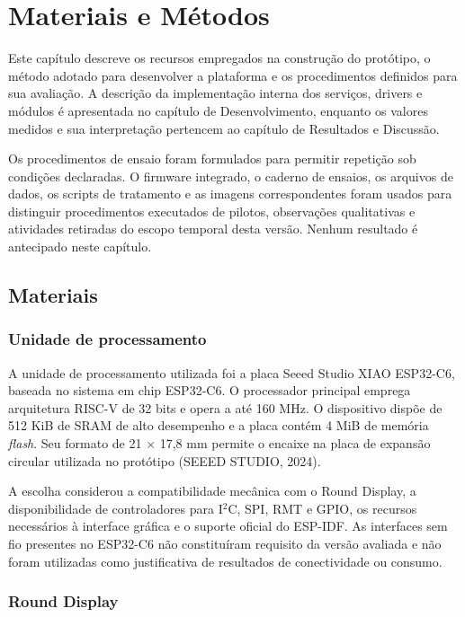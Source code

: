 \documentclass[a4paper,12pt]{article}
\begin{document}
\section{Materiais e M\'etodos}


Este cap\'itulo descreve os recursos empregados na constru\c{c}\~ao do prot\'otipo, o m\'etodo adotado para desenvolver a plataforma e os procedimentos definidos para sua avalia\c{c}\~ao. A descri\c{c}\~ao da implementa\c{c}\~ao interna dos servi\c{c}os, drivers e m\'odulos \'e apresentada no cap\'itulo de Desenvolvimento, enquanto os valores medidos e sua interpreta\c{c}\~ao pertencem ao cap\'itulo de Resultados e Discuss\~ao.


Os procedimentos de ensaio foram formulados para permitir repeti\c{c}\~ao sob condi\c{c}\~oes declaradas. O firmware integrado, o caderno de ensaios, os arquivos de dados, os scripts de tratamento e as imagens correspondentes foram usados para distinguir procedimentos executados de pilotos, observa\c{c}\~oes qualitativas e atividades retiradas do escopo temporal desta vers\~ao. Nenhum resultado \'e antecipado neste cap\'itulo.


\subsection{Materiais}


\subsubsection{Unidade de processamento}


A unidade de processamento utilizada foi a placa Seeed Studio XIAO ESP32-C6, baseada no sistema em chip ESP32-C6. O processador principal emprega arquitetura RISC-V de 32 bits e opera a at\'e 160 MHz. O dispositivo disp\~oe de 512 KiB de SRAM de alto desempenho e a placa cont\'em 4 MiB de mem\'oria \emph{flash}. Seu formato de 21 $\times$ 17,8 mm permite o encaixe na placa de expans\~ao circular utilizada no prot\'otipo (SEEED STUDIO, 2024).


A escolha considerou a compatibilidade mec\^anica com o Round Display, a disponibilidade de controladores para I$^2$C, SPI, RMT e GPIO, os recursos necess\'arios \`a interface gr\'afica e o suporte oficial do ESP-IDF. As interfaces sem fio presentes no ESP32-C6 n\~ao constitu\'iram requisito da vers\~ao avaliada e n\~ao foram utilizadas como justificativa de resultados de conectividade ou consumo.


\subsubsection{Round Display}
\end{document}
